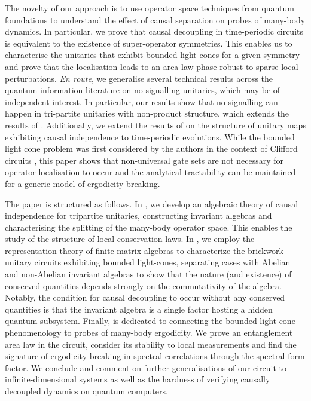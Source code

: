 \documentclass[11pt, twocolumn, floatfix, superscriptaddress, aps, prb, raggedbottom]{revtex4-2}
\begin{document}
The novelty of our approach is to use operator space techniques from quantum foundations to understand the effect of causal separation on probes of many-body dynamics. 
In particular, we prove that causal decoupling in time-periodic circuits is equivalent to the existence of super-operator symmetries. 
This enables us to characterise the unitaries that exhibit bounded light cones for a given symmetry and prove that the localisation leads to an area-law phase robust to sparse local perturbations. \textit{En route}, we generalise several technical results across the quantum information literature on no-signalling unitaries, which may be of independent interest.
In particular, our results show that no-signalling can happen in tri-partite unitaries with non-product structure, which extends the results of \cite{Beckman2001_causal_quatum_op}. 
Additionally, we extend the results of \cite{Lorenz2021, Ormrod2023} on the structure of unitary maps exhibiting causal independence to time-periodic evolutions.
While the bounded light cone problem was first considered by the authors in the context of Clifford circuits \cite{Kovacs2026}, this paper shows that non-universal gate sets are not necessary for operator localisation to occur and the analytical tractability can be maintained for a generic model of ergodicity breaking.

The paper is structured as follows. In , we develop an algebraic theory of causal independence for tripartite unitaries, constructing invariant algebras and characterising the splitting of the many-body operator space. This enables the study of the structure of local conservation laws. In , we employ the representation theory of finite matrix algebras to characterize the brickwork unitary circuits exhibiting bounded light-cones, separating cases with Abelian and non-Abelian invariant algebras to show that the nature (and existence) of conserved quantities depends strongly on the commutativity of the algebra. Notably, the condition for causal decoupling to occur without any conserved quantities is that the invariant algebra is a single factor hosting a hidden quantum subsystem. Finally,  is dedicated to connecting the bounded-light cone phenomenology to probes of many-body ergodicity. We prove an entanglement area law in the circuit, consider its stability to local measurements and find the signature of ergodicity-breaking in spectral correlations through the spectral form factor. We conclude and comment on further generalisations of our circuit to infinite-dimensional systems as well as the hardness of verifying causally decoupled dynamics on quantum computers. 
\end{document}
